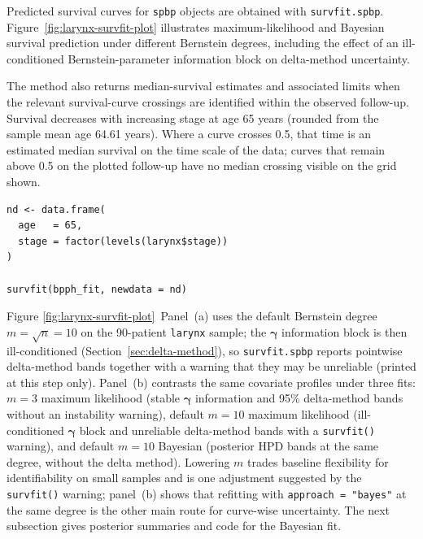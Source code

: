\documentclass[5p,lefttitle]{elsarticle}
\begin{document}
{Predicted survival curves for \texttt{spbp} objects are obtained with
\texttt{survfit.spbp}. Figure~\ref{fig:larynx-survfit-plot} illustrates
maximum-likelihood and Bayesian survival prediction under different
Bernstein degrees, including the effect of an ill-conditioned
Bernstein-parameter information block on delta-method uncertainty.

The method also returns median-survival estimates and associated limits
when the relevant survival-curve crossings are identified within the
observed follow-up.
Survival decreases with
increasing stage at age 65 years (rounded from the sample mean age
64.61 years). Where a curve crosses 0.5, that time is an estimated
median survival on the time scale of the data; curves that remain above 0.5 on the plotted
follow-up have no median crossing visible on the grid shown.

{\footnotesize\begin{verbatim}
nd <- data.frame(
  age   = 65,
  stage = factor(levels(larynx$stage))
)

survfit(bpph_fit, newdata = nd)
\end{verbatim}}


Figure \ref{fig:larynx-survfit-plot}~Panel~(a) uses the default Bernstein degree
$m=\sqrt{n}=10$ on the 90-patient \texttt{larynx} sample;
the $\boldsymbol{\gamma}$ information block is then ill-conditioned
(Section~\ref{sec:delta-method}), so \texttt{survfit.spbp} reports pointwise
delta-method bands together with a warning that they may be unreliable
(printed at this step only).
Panel~(b) contrasts the same covariate profiles under three fits:
$m=3$ maximum likelihood (stable $\boldsymbol{\gamma}$ information and
95\% delta-method bands without an instability warning), default
$m=10$ maximum likelihood (ill-conditioned $\boldsymbol{\gamma}$ block and
unreliable delta-method bands with a \texttt{survfit()} warning), and
default $m=10$ Bayesian (posterior HPD bands at the same degree, without
the delta method).
Lowering $m$ trades baseline flexibility for identifiability on small
samples and is one adjustment suggested by the \texttt{survfit()} warning;
panel~(b) shows that refitting with \texttt{approach = "bayes"} at the
same degree is the other main route for curve-wise uncertainty. The next
subsection gives posterior summaries and code for the Bayesian fit.

}
\end{document}
